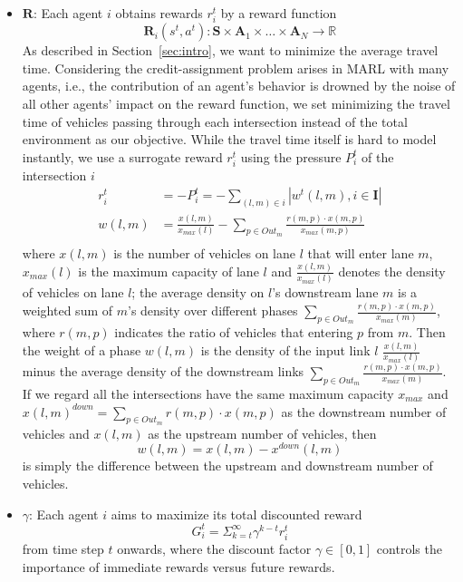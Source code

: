 \begin{itemize}[leftmargin=*]
    \item $\pmb{R}$: Each agent $i$ obtains rewards $r_i^t$ by a reward function
    \begin{equation}
    \pmb{R}_i(s^t,a^t): \pmb{S}\times \pmb{A}_1 \times \dots \times \pmb{A}_N \rightarrow \mathbb{R}
    \end{equation}
    As described in Section~\ref{sec:intro}, we want to minimize the average travel time. Considering the credit-assignment problem arises in MARL with many agents, i.e., the contribution of an agent's behavior is drowned by the noise of all other agents' impact on the reward function, we set minimizing the travel time of vehicles passing through each intersection instead of the total environment as our objective. While the travel time itself is hard to model instantly, we use a surrogate reward $r_i^t$ using the pressure $P_i^t$ of the intersection $i$
        \begin{subequations}
        \label{eq:reward-detail}
        \begin{align}
        r_i^t & = - P_i^t = - \sum_{(l,m)\in i}|w^t(l,m),  i \in\pmb{I}| \\
        w(l,m) & = \frac{x(l,m)}{x_{max}(l)}-\sum_{p\in Out_m}\frac{r(m,p)\cdot x(m,p)}{x_{max}(m,p)}\\
        \end{align}
        \end{subequations}
    where $x(l,m)$ is the number of vehicles on lane $l$ that will enter lane $m$, $x_{max}(l)$ is the maximum capacity of lane $l$ and $\frac{x(l,m)}{x_{max}(l)}$ denotes the density of vehicles on lane $l$; the average density on $l$'s downstream lane $m$ is a weighted sum of $m$'s density over different phases $\sum_{p\in Out_m}\frac{r(m,p)\cdot x(m,p)}{x_{max}(m)}$, where $r(m,p)$ indicates the ratio of vehicles that entering $p$ from $m$. Then the weight of a phase $w(l,m)$ is the density of the input link $l$ $\frac{x(l,m)}{x_{max}(l)}$ minus the average density of the downstream links $\sum_{p\in Out_m}\frac{r(m,p)\cdot x(m,p)}{x_{max}(m)}$.
    If we regard all the intersections have the same maximum capacity $x_{max}$ and $x(l,m)^{down}=\sum_{p\in Out_m}{r(m,p)\cdot x(m,p)}$ as the downstream number of vehicles and $x(l,m)$ as the upstream number of vehicles, then 
    \begin{equation}
    w(l,m)= x(l,m)-x^{down}(l,m)
    \end{equation}
    is simply the difference between the upstream and downstream number of vehicles.
    
    
    \item $\gamma$: Each agent $i$ aims to maximize its total discounted reward
    \begin{equation}
    G^t_i=\Sigma_{k=t}^\infty\gamma^{k-t}r_i^t
    \end{equation}
    from time step $t$ onwards, where the discount factor $\gamma \in [0, 1]$ controls the importance of immediate rewards versus future rewards. 
        
\end{itemize}

